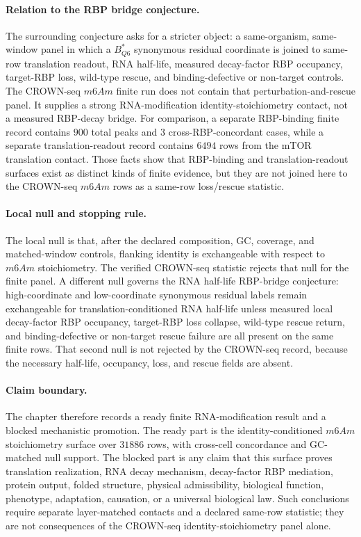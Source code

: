 \paragraph{Relation to the RBP bridge conjecture.}
The surrounding conjecture asks for a stricter object: a same-organism, same-window panel in which a $B^*_{Q6}$ synonymous residual coordinate is joined to same-row translation readout, RNA half-life, measured decay-factor RBP occupancy, target-RBP loss, wild-type rescue, and binding-defective or non-target controls.  The CROWN-seq $m6Am$ finite run does not contain that perturbation-and-rescue panel.  It supplies a strong RNA-modification identity-stoichiometry contact, not a measured RBP-decay bridge.  For comparison, a separate RBP-binding finite record contains $900$ total peaks and $3$ cross-RBP-concordant cases, while a separate translation-readout record contains $6494$ rows from the mTOR translation contact.  Those facts show that RBP-binding and translation-readout surfaces exist as distinct kinds of finite evidence, but they are not joined here to the CROWN-seq $m6Am$ rows as a same-row loss/rescue statistic.

\paragraph{Local null and stopping rule.}
The local null is that, after the declared composition, GC, coverage, and matched-window controls, flanking identity is exchangeable with respect to $m6Am$ stoichiometry.  The verified CROWN-seq statistic rejects that null for the finite panel.  A different null governs the RNA half-life RBP-bridge conjecture: high-coordinate and low-coordinate synonymous residual labels remain exchangeable for translation-conditioned RNA half-life unless measured local decay-factor RBP occupancy, target-RBP loss collapse, wild-type rescue return, and binding-defective or non-target rescue failure are all present on the same finite rows.  That second null is not rejected by the CROWN-seq record, because the necessary half-life, occupancy, loss, and rescue fields are absent.

\paragraph{Claim boundary.}
The chapter therefore records a ready finite RNA-modification result and a blocked mechanistic promotion.  The ready part is the identity-conditioned $m6Am$ stoichiometry surface over $31886$ rows, with cross-cell concordance and GC-matched null support.  The blocked part is any claim that this surface proves translation realization, RNA decay mechanism, decay-factor RBP mediation, protein output, folded structure, physical admissibility, biological function, phenotype, adaptation, causation, or a universal biological law.  Such conclusions require separate layer-matched contacts and a declared same-row statistic; they are not consequences of the CROWN-seq identity-stoichiometry panel alone.